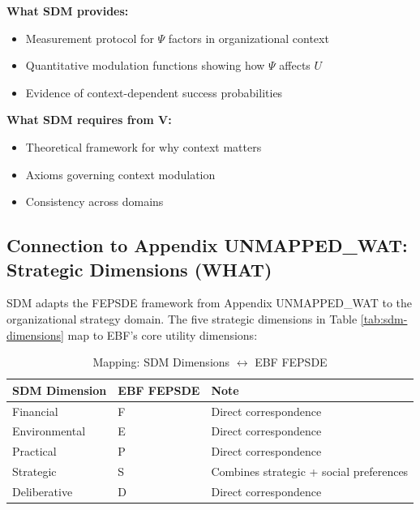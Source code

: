 \begin{tcolorbox}[colback=yellow!5!white, colframe=yellow!75!black,
    title=Integration: SDM $\leftrightarrow$ Appendix CTW (WHEN)]

\textbf{What SDM provides:}
\begin{itemize}[nosep]
\item Measurement protocol for $\Psi$ factors in organizational context
\item Quantitative modulation functions showing how $\Psi$ affects $U$
\item Evidence of context-dependent success probabilities
\end{itemize}

\textbf{What SDM requires from V:}
\begin{itemize}[nosep]
\item Theoretical framework for why context matters
\item Axioms governing context modulation
\item Consistency across domains
\end{itemize}

\end{tcolorbox}

\subsection{Connection to Appendix UNMAPPED_WAT: Strategic Dimensions (WHAT)}

SDM adapts the FEPSDE framework from Appendix UNMAPPED_WAT to the organizational strategy domain. The five strategic dimensions in Table \ref{tab:sdm-dimensions} map to EBF's core utility dimensions:

\begin{table}[htbp]
\centering
\caption{Mapping: SDM Dimensions $\leftrightarrow$ EBF FEPSDE}
\label{tab:sdm-fepsde-mapping}
\renewcommand{\arraystretch}{1.3}
\begin{tabular}{@{}lll@{}}
\toprule
\textbf{SDM Dimension} & \textbf{EBF FEPSDE} & \textbf{Note} \\
\midrule
Financial & F & Direct correspondence \\
Environmental & E & Direct correspondence \\
Practical & P & Direct correspondence \\
Strategic & S & Combines strategic + social preferences \\
Deliberative & D & Direct correspondence \\
\bottomrule
\end{tabular}
\end{table}

